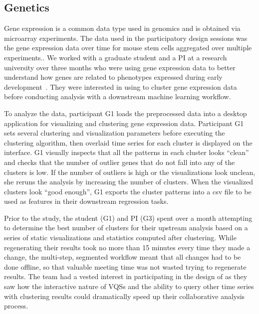 \subsection{Genetics}
\par Gene expression is a common data type used in genomics and is obtained via microarray experiments.  The data used in the participatory design sessions was the gene expression data over time for mouse stem cells aggregated over multiple experiments.. We worked with a graduate student and a PI at a research university over three months who were using gene expression data to better understand how genes are related to phenotypes expressed during early development~\cite{Peng2016,Gloss2017}. They were interested in using \zv to cluster gene expression data before conducting analysis with a downstream machine learning workflow.
\par To analyze the data, participant G1 loads the preprocessed data into a desktop application for visualizing and clustering gene expression data. Participant G1 sets several clustering and visualization parameters before executing the clustering algorithm, then overlaid time series for each cluster is displayed on the interface. G1 visually inspects that all the patterns in each cluster looks ``clean'' and checks that the number of outlier genes that do not fall into any of the clusters is low.  If the number of outliers is high or the visualizations look unclean, she reruns the analysis by increasing the number of clusters. When the visualized clusters look ``good enough'', G1 exports the cluster patterns into a csv file to be used as features in their downstream regression tasks.
\par Prior to the study, the student (G1) and PI (G3) spent over a month attempting to determine the best number of clusters for their upstream analysis based on a series of static visualizations and statistics computed after clustering. While regenerating their results took no more than 15 minutes every time they made a change, the multi-step, segmented workflow meant that all changes had to be done offline, so that valuable meeting time was not wasted trying to regenerate results. The team had a vested interest in participating in the design of \zv as they saw how the interactive nature of VQSs and the ability to query other time series with clustering results could dramatically speed up their collaborative analysis process.


